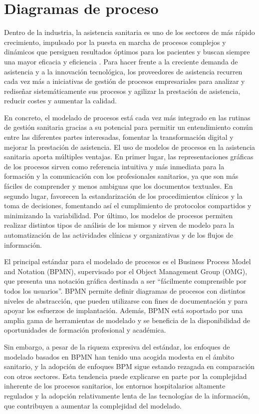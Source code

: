 \section{Diagramas de proceso}

Dentro de la industria, la asistencia sanitaria es uno de los sectores de más rápido crecimiento, impulsado por la puesta en marcha de procesos complejos y dinámicos que persiguen resultados óptimos para los pacientes y buscan siempre una mayor eficacia y eficiencia \cite{pufahl_bpmn_2022}.
Para hacer frente a la creciente demanda de asistencia y a la innovación tecnológica, los proveedores de asistencia recurren cada vez más a iniciativas de gestión de procesos empresariales para analizar y rediseñar sistemáticamente sus procesos y agilizar la prestación de asistencia, reducir costes y aumentar la calidad.

En concreto, el modelado de procesos está cada vez más integrado en las rutinas de gestión sanitaria gracias a su potencial para permitir un entendimiento común entre las diferentes partes interesadas, fomentar la transformación digital y mejorar la prestación de asistencia.
El uso de modelos de procesos en la asistencia sanitaria aporta múltiples ventajas.
En primer lugar, las representaciones gráficas de los procesos sirven como referencia intuitiva y más inmediata para la formación y la comunicación con los profesionales sanitarios, ya que son más fáciles de comprender y menos ambiguas que los documentos textuales.
En segundo lugar, favorecen la estandarización de los procedimientos clínicos y la toma de decisiones, fomentando así el cumplimiento de protocolos compartidos y minimizando la variabilidad.
Por último, los modelos de procesos permiten realizar distintos tipos de análisis de los mismos y sirven de modelo para la automatización de las actividades clínicas y organizativas y de los flujos de información.

El principal estándar para el modelado de procesos es el Business Process Model and Notation (BPMN), supervisado por el Object Management Group (OMG), que presenta una notación gráfica destinada a ser ``fácilmente comprensible por todos los usuarios''.
BPMN permite definir diagramas de procesos con distintos niveles de abstracción, que pueden utilizarse con fines de documentación y para apoyar los esfuerzos de implantación.
Además, BPMN está soportado por una amplia gama de herramientas de modelado y se beneficia de la disponibilidad de oportunidades de formación profesional y académica.

Sin embargo, a pesar de la riqueza expresiva del estándar, los enfoques de modelado basados en BPMN han tenido una acogida modesta en el ámbito sanitario, y la adopción de enfoques BPM sigue estando rezagada en comparación con otros sectores.
Esta tendencia puede explicarse en parte por la complejidad inherente de los procesos sanitarios, los entornos hospitalarios altamente regulados y la adopción relativamente lenta de las tecnologías de la información, que contribuyen a aumentar la complejidad del modelado.

